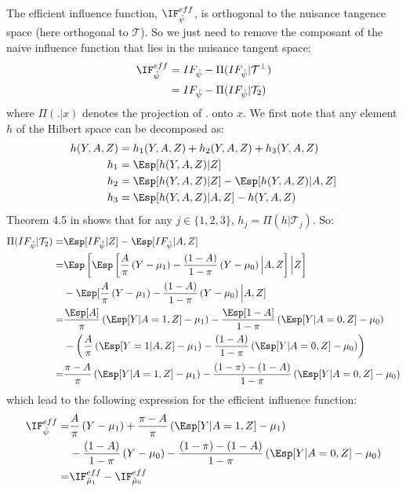 \documentclass[12pt]{article}
\newcommand\Tspace{\mathcal{T}}
\begin{document}
The efficient influence function, \(\IF^{eff}_{\hat{\psi}}\), is
orthogonal to the nuisance tangence space (here orthogonal to
\(\Tspace\)). So we just need to remove the composant of the naive
influence function that lies in the nuisance tangent space:
\begin{align*}
\IF^{eff}_{\hat{\psi}} &= IF_{\hat{\psi}} - \Pi(IF_{\hat{\psi}}|\Tspace^{\perp}) \\
&= IF_{\hat{\psi}} - \Pi(IF_{\hat{\psi}}|\Tspace_2) 
\end{align*}
where \(\Pi(.|x)\) denotes the projection of \(.\) onto \(x\). We
first note that any element \(h\) of
the Hilbert space can be decomposed as:
\begin{align*}
h(Y,A,Z) &= h_1(Y,A,Z) + h_2(Y,A,Z) + h_3(Y,A,Z) \\
h_1 &= \Esp[h(Y,A,Z)|Z] \\
h_2 &= \Esp[h(Y,A,Z)|Z] - \Esp[h(Y,A,Z)|A,Z] \\
h_3 &= \Esp[h(Y,A,Z)|A,Z] - h(Y,A,Z)
\end{align*}
Theorem 4.5 in \cite{tsiatis2007semiparametric} shows that for any \(j
\in \{1,2,3\}\), \(h_j=\Pi(h|\Tspace_j)\). So:
\begin{align*}
\Pi(IF_{\hat{\psi}}|\Tspace_2) =& \Esp[IF_{\hat{\psi}}|Z] - \Esp[IF_{\hat{\psi}}|A,Z] \\
=& \Esp\left[\Esp\left[\frac{A}{\pi} \left(Y - \mu_1\right) - \frac{(1-A)}{1-\pi}\left(Y - \mu_0\right) \Big| A,Z\right] \Big| Z\right] \\
&- \Esp[\frac{A}{\pi} \left(Y - \mu_1\right) - \frac{(1-A)}{1-\pi}\left(Y - \mu_0\right) \Big| A,Z] \\
=& \frac{\Esp[A]}{\pi} \left(\Esp[Y|A=1,Z] - \mu_1\right) - \frac{\Esp[1-A]}{1-\pi}\left(\Esp[Y|A=0,Z] - \mu_0\right) \\
&- \left( \frac{A}{\pi} \left(\Esp[Y=1|A,Z] - \mu_1\right) - \frac{(1-A)}{1-\pi}\left(\Esp[Y|A=0,Z] - \mu_0\right)\right)  \\
=& \frac{\pi-A}{\pi} \left(\Esp[Y|A=1,Z] - \mu_1\right) - \frac{(1-\pi) - (1-A)}{1-\pi}\left(\Esp[Y|A=0,Z] - \mu_0\right) 
\end{align*}
which lead to the following expression for the efficient influence function:
\begin{align*}
\IF^{eff}_{\hat{\psi}} =& \frac{A}{\pi} \left(Y - \mu_1\right) + \frac{\pi-A}{\pi} \left(\Esp[Y|A=1,Z] - \mu_1\right) \\
&- \frac{(1-A)}{1-\pi}\left(Y - \mu_0\right) - \frac{(1-\pi) - (1-A)}{1-\pi}\left(\Esp[Y|A=0,Z] - \mu_0\right)  \\
=& \IF^{eff}_{\hat{\mu}_1} - \IF^{eff}_{\hat{\mu}_0}
\end{align*}
\end{document}
